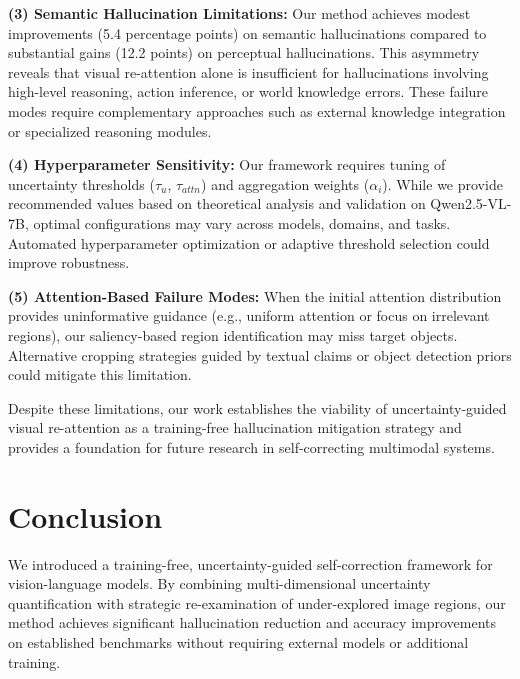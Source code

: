 \documentclass[12pt]{article}
\begin{document}
\vspace{1em}

\textbf{(3) Semantic Hallucination Limitations:} Our method achieves modest improvements 
(5.4 percentage points) on semantic hallucinations compared to substantial gains (12.2 points) on perceptual hallucinations. This asymmetry reveals that visual re-attention alone is insufficient for hallucinations involving high-level reasoning, action inference, or world knowledge errors. These failure modes require complementary approaches such as external knowledge integration or specialized reasoning modules.

\vspace{1em}

\textbf{(4) Hyperparameter Sensitivity:} Our framework requires tuning of uncertainty thresholds ($\tau_u$, $\tau_{attn}$) and aggregation weights ($\alpha_i$). While we provide recommended values based on theoretical analysis and validation on Qwen2.5-VL-7B, optimal configurations may vary across models, domains, and tasks. Automated hyperparameter optimization or adaptive threshold selection could improve robustness.

\vspace{1em}

\textbf{(5) Attention-Based Failure Modes:} When the initial attention distribution provides uninformative guidance (e.g., uniform attention or focus on irrelevant regions), our saliency-based region identification may miss target objects. Alternative cropping strategies guided by textual claims or object detection priors could mitigate this limitation.

\vspace{1em}

Despite these limitations, our work establishes the viability of uncertainty-guided visual re-attention as a training-free hallucination mitigation strategy and provides a foundation for future research in self-correcting multimodal systems.

\section{Conclusion}

We introduced a training-free, uncertainty-guided self-correction framework for vision-language models. By combining multi-dimensional uncertainty quantification with strategic re-examination of under-explored image regions, our method achieves significant hallucination reduction and accuracy improvements on established benchmarks without requiring external models or additional training.
\end{document}
